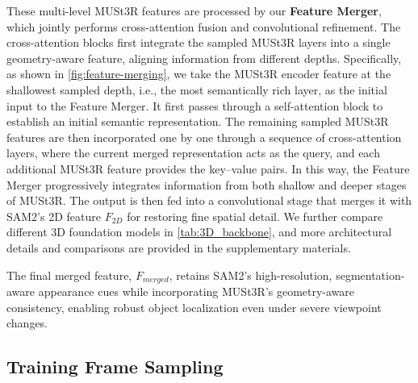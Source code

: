 These multi-level MUSt3R features are processed by our \textbf{Feature Merger}, which jointly performs cross-attention fusion and convolutional refinement. The cross-attention blocks first integrate the sampled MUSt3R layers into a single geometry-aware feature, aligning information from different depths. 
Specifically, as shown in \cref{fig:feature-merging}, we take the MUSt3R encoder feature at the shallowest sampled depth, i.e., the most semantically rich layer, as the initial input to the Feature Merger. It first passes through a self-attention block to establish an initial semantic representation. The remaining sampled MUSt3R features are then incorporated one by one through a sequence of cross-attention layers, where the current merged representation acts as the query, and each additional MUSt3R feature provides the key–value pairs. In this way, the Feature Merger progressively integrates information from both shallow and deeper stages of MUSt3R.
The output is then fed into a convolutional stage that merges it with SAM2’s 2D feature $F_{2D}$ for restoring fine spatial detail. We further compare different 3D foundation models in \cref{tab:3D_backbone}, and more architectural details and comparisons are provided in the supplementary materials.

The final merged feature, $F_{{merged}}$, retains SAM2’s high-resolution, segmentation-aware appearance cues while incorporating MUSt3R’s geometry-aware consistency, enabling robust object localization even under severe viewpoint changes. 




\vspace{-0.5em}
\subsection{Training Frame Sampling}
\label{subsec:sampling}
\vspace{-0.5em}



